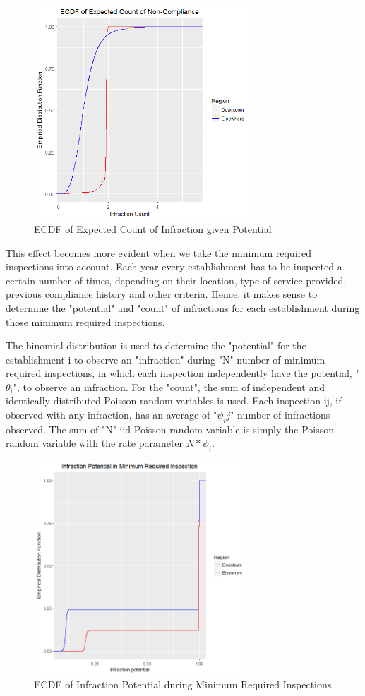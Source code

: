 \documentclass[twoside,onecolumn]{article}
\begin{document}
\begin{figure}[H]
\centering
\includegraphics[height=8cm]{ECDF}
\caption{ECDF of Expected Count of Infraction given Potential}
\label{fig:ECDF of Expected Count of Infraction}
\end{figure}

This effect becomes more evident when we take the minimum required inspections into account. Each year every establishment has to be inspected a certain number of times, depending on their location, type of service provided, previous compliance history and other criteria. Hence, it makes sense to determine the "potential" and "count" of infractions for each establishment during those minimum required inspections. 

The binomial distribution is used to determine the "potential" for the establishment i to observe an "infraction" during "N" number of minimum required inspections, in which each inspection independently have the potential, "$\theta_i$", to observe an infraction. For the "count", the sum of independent and identically distributed Poisson random variables is used. Each inspection ij, if observed with any infraction, has an average of "$\psi_ij$" number of infractions observed. The sum of "N" iid Poisson random variable is simply the Poisson random variable with the rate parameter $N*\psi_{i}$. 

\begin{figure}[H]
\centering
\includegraphics[height=8cm]{ECDF_min_potential}
\caption{ECDF of Infraction Potential during Minimum Required Inspections}
\label{fig:ECDF_min_potential}
\end{figure}
\end{document}
